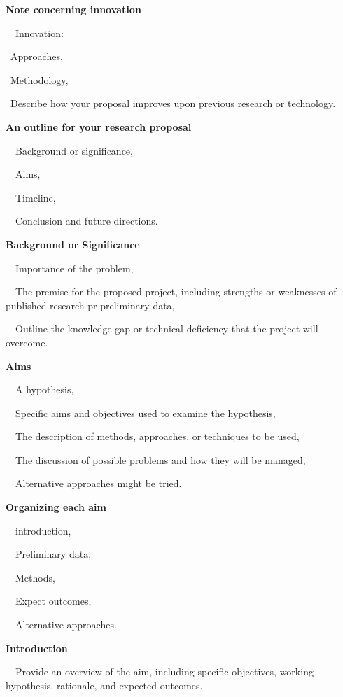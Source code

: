 \documentclass[a4paper, 12pt]{article}
\begin{document}
\textbf{Note concerning innovation}
\par\ \textbullet\ Innovation:
\par\quad\textopenbullet\ Approaches,
\par\quad\textopenbullet\ Methodology,
\par\quad\textopenbullet\ Describe how your proposal improves upon previous research or technology.

\textbf{An outline for your research proposal}
\par\ \textbullet\ Background or significance,
\par\ \textbullet\ Aims,
\par\ \textbullet\ Timeline,
\par\ \textbullet\ Conclusion and future directions.

\textbf{Background or Significance}
\par\ \textbullet\ Importance of the problem,
\par\ \textbullet\ The premise for the proposed project, including strengths or weaknesses of published research pr preliminary data,
\par\ \textbullet\ Outline the knowledge gap or technical deficiency that the project will overcome.

\newpage\textbf{Aims}
\par\ \textbullet\ A hypothesis,
\par\ \textbullet\ Specific aims and objectives used to examine the hypothesis,
\par\ \textbullet\ The description of methods, approaches, or techniques to be used,
\par\ \textbullet\ The discussion of possible problems and how they will be managed,
\par\ \textbullet\ Alternative approaches might be tried.

\textbf{Organizing each aim}
\par\ \textbullet\ introduction,
\par\ \textbullet\ Preliminary data,
\par\ \textbullet\ Methods,
\par\ \textbullet\ Expect outcomes,
\par\ \textbullet\ Alternative approaches.

\textbf{Introduction}
\par\ \textbullet\ Provide an overview of the aim, including specific objectives, working hypothesis, rationale, and expected outcomes.
\end{document}
